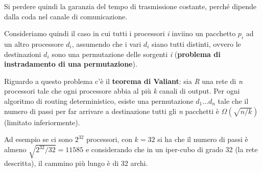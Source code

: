 Si perdere quindi la garanzia del tempo di trasmissione costante, perché dipende dalla coda nel canale di comunicazione.

Consideriamo quindi il caso in cui tutti i processori \emph{i} inviino un pacchetto $p_i$ ad un altro processore $d_i$, assumendo che i vari $d_i$ siano tutti distinti, ovvero le destinazioni $d_i$ sono una permutazione delle sorgenti \emph{i} (\textbf{problema di instradamento di una permutazione}).

Riguardo a questo problema c'è il \textbf{teorema di Valiant}: sia \emph{R} una rete di \emph{n} processori tale che ogni processore abbia al più \emph{k} canali di output. 
Per ogni algoritmo di routing deterministico, esiste una permutazione $d_1 \ldots d_n$ tale che il numero di passi per far arrivare a destinazione tutti gli \emph{n} pacchetti è $\Omega(\sqrt{n/k})$ (limitato inferiormente).

Ad esempio se ci sono $2^{32}$ processori, con $k = 32$ si ha che il numero di passi è almeno $\sqrt{2^{32} /32} = 11585$ e considerando che in un iper-cubo di grado 32 (la rete descritta), il cammino più lungo è di 32 archi.
